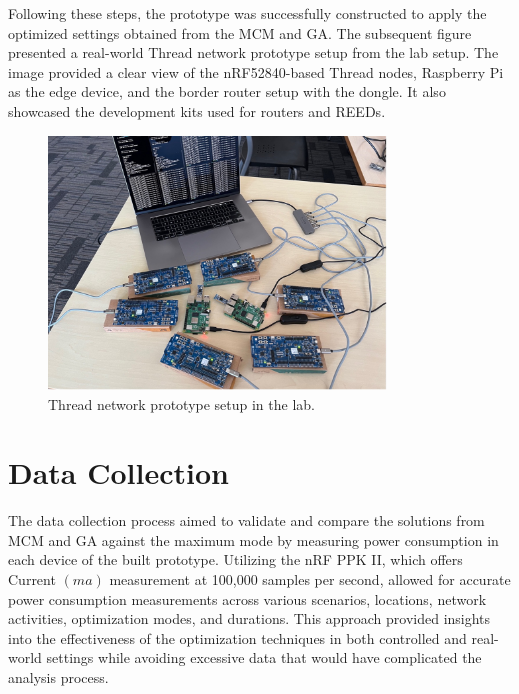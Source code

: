 Following these steps, the prototype was successfully constructed to apply the optimized settings obtained from the \gls{MCM} and \gls{GA}. The subsequent figure presented a real-world Thread network prototype setup from the lab setup. The image provided a clear view of the \gls{nRF}52840-based Thread nodes, Raspberry Pi as the edge device, and the border router setup with the dongle. It also showcased the development kits used for routers and \glspl{REED}.

\begin{figure}[H]
    \centering
    \includegraphics[width=0.8\textwidth]{images/research_design/prototype_setup.jpg}
    \caption{Thread network prototype setup in the lab.}
    \label{fig:prototype_setup}
\end{figure}

\section{Data Collection}

The data collection process aimed to validate and compare the solutions from \gls{MCM} and \gls{GA} against the maximum mode by measuring power consumption in each device of the built prototype. Utilizing the \gls{nRF} \gls{PPK} II, which offers Current $\left(ma\right)$ measurement at 100,000 samples per second, allowed for accurate power consumption measurements across various scenarios, locations, network activities, optimization modes, and durations. This approach provided insights into the effectiveness of the optimization techniques in both controlled and real-world settings while avoiding excessive data that would have complicated the analysis process.

